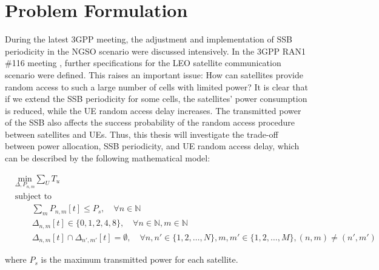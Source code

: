 
\section{Problem Formulation}

During the latest 3GPP meeting, the adjustment and implementation of SSB periodicity in the NGSO scenario were discussed intensively. In the 3GPP RAN1 \#116 meeting \cite{ran1-116}, further specifications for the LEO satellite communication scenario were defined. This raises an important issue: How can satellites provide random access to such a large number of cells with limited power? It is clear that if we extend the SSB periodicity for some cells, the satellites' power consumption is reduced, while the UE random access delay increases. The transmitted power of the SSB also affects the success probability of the random access procedure between satellites and UEs. Thus, this thesis will investigate the trade-off between power allocation, SSB periodicity, and UE random access delay, which can be described by the following mathematical model:

\begin{equation}
\begin{aligned}
    & \underset{\Delta, P_{n, m}}{\text{min}} \sum_{U} T_u \\
    & \text{subject to} \\
    & \qquad \sum_{m} P_{n,m}[t] \leq P_s, \quad \forall n \in \mathbb{N} \\
    & \qquad \Delta_{n, m}[t] \in \{0, 1, 2, 4, 8\}, \quad \forall n \in \mathbb{N}, m \in \mathbb{N} \\
    & \qquad \Delta_{n, m}[t] \cap \Delta_{n', m'}[t] = \emptyset, \quad \forall n, n' \in \{1, 2, \ldots, N\}, m, m' \in \{1, 2, \ldots, M\}, (n, m) \neq (n', m')
\end{aligned}
\end{equation}

where $P_s$ is the maximum transmitted power for each satellite.